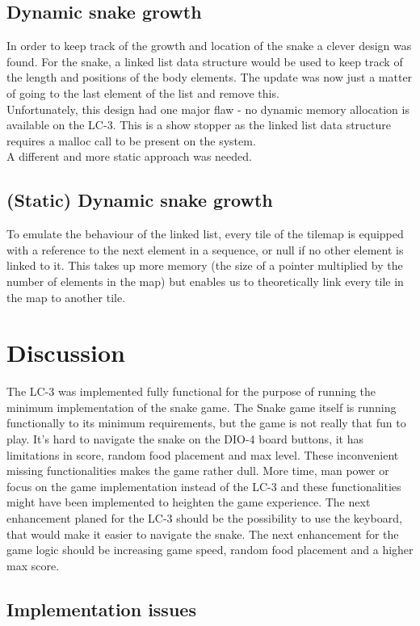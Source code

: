 \documentclass{acm_proc_article-sp}
\begin{document}

\subsection{Dynamic snake growth}
In order to keep track of the growth and location of the snake a clever design was found. For the snake, a linked list data structure would be used to keep track of the length and positions of the body elements. The update was now just a matter of going to the last element of the list and remove this.\\
Unfortunately, this design had one major flaw - no dynamic memory allocation is available on the LC-3. This is a show stopper as the linked list data structure requires a malloc call to be present on the system.\\
A different and more static approach was needed.
\subsection{(Static) Dynamic snake growth}
To emulate the behaviour of the linked list, every tile of the tilemap is equipped with a reference to the next element in a sequence, or null if no other element is linked to it. This takes up more memory (the size of a pointer multiplied by the number of elements in the map) but enables us to theoretically link every tile in the map to another tile.

\section{Discussion}
The LC-3 was implemented fully functional for the purpose of running the minimum implementation of the snake game.
The Snake game itself is running functionally to its minimum requirements, but the game is not really that fun to play. 
It's hard to navigate the snake on the DIO-4 board buttons, it has limitations in score, random food placement and max level.
These inconvenient missing functionalities makes the game rather dull. More time, man power or focus on the game implementation instead of the LC-3 and these functionalities might have been implemented to heighten the game experience.
The next enhancement planed for the LC-3 should be the possibility to use the keyboard, that would make it easier to navigate the snake.
The next enhancement for the game logic should be increasing game speed, random food placement and a higher max score.
\subsection{Implementation issues}
\end{document}
